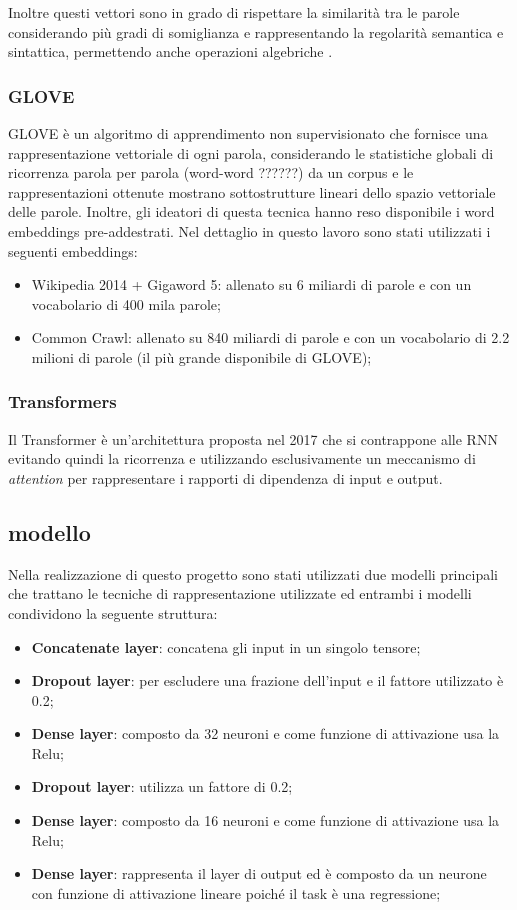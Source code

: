 Inoltre questi vettori sono in grado di rispettare la similarità tra le parole
considerando più gradi di somiglianza e rappresentando la regolarità semantica e
sintattica, permettendo anche operazioni algebriche \cite{mikolov2013efficient}.


\subsubsection{GLOVE}
GLOVE \cite{pennington2014glove} è un algoritmo di apprendimento non supervisionato che fornisce una rappresentazione vettoriale di ogni parola, considerando le statistiche globali di ricorrenza parola per parola (word-word ??????) da un corpus e le rappresentazioni ottenute mostrano sottostrutture lineari dello spazio vettoriale delle parole. Inoltre, gli ideatori di questa tecnica hanno reso disponibile i word embeddings pre-addestrati.
Nel dettaglio in questo lavoro sono stati utilizzati i seguenti embeddings:
\begin{itemize}
	\item Wikipedia 2014 + Gigaword 5: allenato su 6 miliardi di parole e con un vocabolario di 400 mila parole;
	\item Common Crawl: allenato su 840 miliardi di parole e con un vocabolario di 2.2 milioni di parole (il più grande disponibile di GLOVE);
\end{itemize}
\subsubsection{Transformers}
Il Transformer è un'architettura proposta nel 2017 che si contrappone alle RNN
evitando quindi la ricorrenza e utilizzando esclusivamente un meccanismo di
\textit{attention} per rappresentare i rapporti di dipendenza di input e output.

\subsection{modello}\label{Modello}
Nella realizzazione di questo progetto sono stati utilizzati due modelli principali che trattano le tecniche di rappresentazione utilizzate ed  entrambi i modelli condividono la seguente struttura:
\begin{itemize}
	\item \textbf{Concatenate layer}: concatena gli input in un singolo tensore;
	\item \textbf{Dropout layer}: per escludere una frazione dell'input e il fattore utilizzato è 0.2;
	\item \textbf{Dense layer}: composto da 32 neuroni e come funzione di attivazione usa la Relu;
	\item \textbf{Dropout layer}: utilizza un fattore di 0.2;
	\item \textbf{Dense layer}: composto da 16 neuroni e come funzione di attivazione usa la Relu;
	\item \textbf{Dense layer}: rappresenta il layer di output ed è composto da un neurone con funzione di attivazione lineare poiché il task è una regressione;
\end{itemize}
